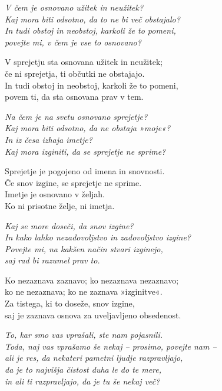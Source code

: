 \emph{V čem je osnovano užitek in neužitek?}\\
\emph{Kaj mora biti odsotno, da to ne bi več obstajalo?}\\
\emph{In tudi obstoj in neobstoj, karkoli že to pomeni,}\\
\emph{povejte mi, v čem je vse to osnovano?}

V sprejetju sta osnovana užitek in neužitek;\\
če ni sprejetja, ti občutki ne obstajajo.\\
In tudi obstoj in neobstoj, karkoli že to pomeni,\\
povem ti, da sta osnovana prav v tem.

\clearpage

\emph{Na čem je na svetu osnovano sprejetje?\\
Kaj mora biti odsotno, da ne obstaja »moje«?}\\
\emph{In iz česa izhaja imetje?}\\
\emph{Kaj mora izginiti, da se sprejetje ne sprime?}

Sprejetje je pogojeno od imena in snovnosti.\\
Če snov izgine, se sprejetje ne sprime.\\
Imetje je osnovano v željah.\\
Ko ni prisotne želje, ni imetja.

\emph{Kaj se more doseči, da snov izgine?}\\
\emph{In kako lahko nezadovoljstvo in zadovoljstvo izgine?}\\
\emph{Povejte mi, na kakšen način stvari izginejo,}\\
\emph{saj rad bi razumel prav to.}

Ko nezaznava zaznavo; ko nezaznava nezaznavo;\\
ko ne nezaznava; ko ne zaznava »izginitve«.\\
Za tistega, ki to doseže, snov izgine,\\
saj je zaznava osnova za uveljavljeno obsedenost.

\emph{To, kar smo vas vprašali, ste nam pojasnili.}\\
\emph{Toda, naj vas vprašamo še nekaj -- prosimo, povejte nam --}\\
\emph{ali je res, da nekateri pametni ljudje razpravljajo,}\\
\emph{da je to najvišja čistost duha le do te mere,}\\
\emph{in ali ti razpravljajo, da je tu še nekaj več?}

